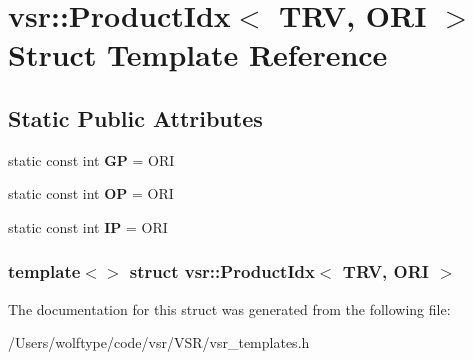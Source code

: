 \hypertarget{structvsr_1_1_product_idx_3_01_t_r_v_00_01_o_r_i_01_4}{\section{vsr\-:\-:Product\-Idx$<$ T\-R\-V, O\-R\-I $>$ Struct Template Reference}
\label{structvsr_1_1_product_idx_3_01_t_r_v_00_01_o_r_i_01_4}
}
\subsection*{Static Public Attributes}
\begin{DoxyCompactItemize}
\item 
\hypertarget{structvsr_1_1_product_idx_3_01_t_r_v_00_01_o_r_i_01_4_ade97e87e745635c30d59bdb98a90d3c4}{static const int {\bfseries G\-P} = O\-R\-I}\label{structvsr_1_1_product_idx_3_01_t_r_v_00_01_o_r_i_01_4_ade97e87e745635c30d59bdb98a90d3c4}

\item 
\hypertarget{structvsr_1_1_product_idx_3_01_t_r_v_00_01_o_r_i_01_4_a71e8159bbb562d87e6acf3729948486d}{static const int {\bfseries O\-P} = O\-R\-I}\label{structvsr_1_1_product_idx_3_01_t_r_v_00_01_o_r_i_01_4_a71e8159bbb562d87e6acf3729948486d}

\item 
\hypertarget{structvsr_1_1_product_idx_3_01_t_r_v_00_01_o_r_i_01_4_a3b95fa7cb1b59fa36bccac32d364af1f}{static const int {\bfseries I\-P} = O\-R\-I}\label{structvsr_1_1_product_idx_3_01_t_r_v_00_01_o_r_i_01_4_a3b95fa7cb1b59fa36bccac32d364af1f}

\end{DoxyCompactItemize}
\subsubsection*{template$<$$>$ struct vsr\-::\-Product\-Idx$<$ T\-R\-V, O\-R\-I $>$}



The documentation for this struct was generated from the following file\-:\begin{DoxyCompactItemize}
\item 
/\-Users/wolftype/code/vsr/\-V\-S\-R/vsr\-\_\-templates.\-h\end{DoxyCompactItemize}
